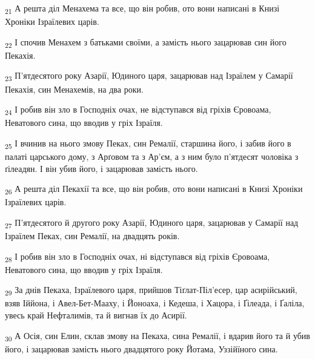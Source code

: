 \begin{tcolorbox}
\textsubscript{21} А решта діл Менахема та все, що він робив, ото вони написані в Книзі Хроніки Ізраїлевих царів.
\end{tcolorbox}
\begin{tcolorbox}
\textsubscript{22} І спочив Менахем з батьками своїми, а замість нього зацарював син його Пекахія.
\end{tcolorbox}
\begin{tcolorbox}
\textsubscript{23} П'ятдесятого року Азарії, Юдиного царя, зацарював над Ізраїлем у Самарії Пекахія, син Менахемів, на два роки.
\end{tcolorbox}
\begin{tcolorbox}
\textsubscript{24} І робив він зло в Господніх очах, не відступався від гріхів Єровоама, Неватового сина, що вводив у гріх Ізраїля.
\end{tcolorbox}
\begin{tcolorbox}
\textsubscript{25} І вчинив на нього змову Пеках, син Ремалії, старшина його, і забив його в палаті царського дому, з Арґовом та з Ар'єм, а з ним було п'ятдесят чоловіка з ґілеадян. І він убив його, і зацарював замість нього.
\end{tcolorbox}
\begin{tcolorbox}
\textsubscript{26} А решта діл Пекахії та все, що він робив, ото вони написані в Книзі Хроніки Ізраїлевих царів.
\end{tcolorbox}
\begin{tcolorbox}
\textsubscript{27} П'ятдесятого й другого року Азарії, Юдиного царя, зацарював у Самарії над Ізраїлем Пеках, син Ремалії, на двадцять років.
\end{tcolorbox}
\begin{tcolorbox}
\textsubscript{28} І робив він зло в Господніх очах, ні відступався від гріхів Єровоама, Неватового сина, що вводив у гріх Ізраїля.
\end{tcolorbox}
\begin{tcolorbox}
\textsubscript{29} За днів Пекаха, Ізраїлевого царя, прийшов Тіґлат-Піл'есер, цар асирійський, взяв Іййона, і Авел-Бет-Мааху, і Йоноаха, і Кедеша, і Хацора, і Ґілеада, і Ґаліла, увесь край Нефталимів, та й вигнав їх до Асирії.
\end{tcolorbox}
\begin{tcolorbox}
\textsubscript{30} А Осія, син Елин, склав змову на Пекаха, сина Ремалії, і вдарив його та й убив його, і зацарював замість нього двадцятого року Йотама, Уззійїного сина.
\end{tcolorbox}
